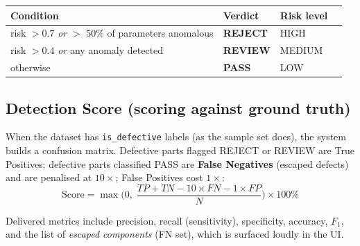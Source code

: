 \documentclass[11pt,a4paper]{article}
\newcommand{\code}[1]{\texttt{\small #1}}
\begin{document}
\begin{center}
\begin{tabular}{llll}
  \toprule
  \textbf{Condition} & \textbf{Verdict} & \textbf{Risk level} \\
  \midrule
  risk $> 0.7$ \emph{or} $>$ 50\% of parameters anomalous & \textbf{REJECT}  & HIGH \\
  risk $> 0.4$ \emph{or} any anomaly detected             & \textbf{REVIEW} & MEDIUM \\
  otherwise                                               & \textbf{PASS}   & LOW \\
  \bottomrule
\end{tabular}
\end{center}

\subsection{Detection Score (scoring against ground truth)}
When the dataset has \code{is\_defective} labels (as the sample set does), the system builds a
confusion matrix. Defective parts flagged REJECT or REVIEW are True Positives; defective parts
classified PASS are \textbf{False Negatives} (escaped defects) and are penalised at
$10\times$; False Positives cost $1\times$:
\[
\mathrm{Score} = \max\!\Big(0,\; \frac{TP+TN - 10\times FN - 1\times FP}{N}\Big) \times 100\%
\]

Delivered metrics include precision, recall (sensitivity), specificity, accuracy, $F_1$, and the
list of \emph{escaped components} (FN set), which is surfaced loudly in the UI.
\end{document}
